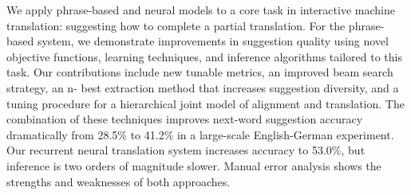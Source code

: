 We apply phrase-based and neural models to a core task in interactive machine translation: suggesting how to complete a partial translation. For the phrase-based system, we demonstrate improvements in suggestion quality using novel objective functions, learning techniques, and inference algorithms tailored to this task. Our contributions include new tunable metrics, an improved beam search strategy, an n- best extraction method that increases suggestion diversity, and a tuning procedure for a hierarchical joint model of alignment and translation. The combination of these techniques improves next-word suggestion accuracy dramatically from 28.5\% to 41.2\% in a large-scale English-German experiment. Our recurrent neural translation system increases accuracy to 53.0\%, but inference is two orders of magnitude slower. Manual error analysis shows the strengths and weaknesses of both approaches.
